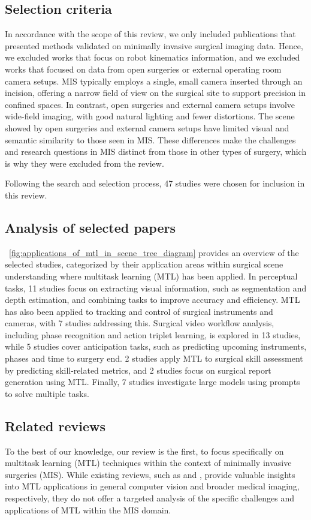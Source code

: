 \documentclass[times,twocolumn,final]{elsarticle}
\newcommand{\figref}[1]{\figurename~\ref{#1}}
\begin{document}
\subsection{Selection criteria}
In accordance with the scope of this review, we only included publications that presented methods validated on minimally invasive surgical imaging data. Hence, we excluded works that focus on robot kinematics information, and we excluded works that focused on data from open surgeries or external operating room camera setups. 
MIS typically employs a single, small camera inserted through an incision, offering a narrow field of view on the surgical site to support precision in confined spaces. In contrast, open surgeries and external camera setups involve wide-field imaging, with good natural lighting and fewer distortions. The scene showed by  open surgeries and external camera setups have limited visual and semantic similarity to those seen in MIS. These differences make the challenges and research questions in MIS distinct from those in other types of surgery, which is why they were excluded from the review.

Following the search and selection process, 47 studies were chosen for inclusion in this review.

\subsection{Analysis of selected papers}

\figref{fig:applications_of_mtl_in_scene_tree_diagram} provides an overview of the selected studies, categorized by their application areas within surgical scene understanding where multitask learning (MTL) has been applied. In perceptual tasks, 11 studies focus on extracting visual information, such as segmentation and depth estimation, and combining tasks to improve accuracy and efficiency. MTL has also been applied to tracking and control of surgical instruments and cameras, with 7 studies addressing this. Surgical video workflow analysis, including phase recognition and action triplet learning, is explored in 13 studies, while 5 studies cover anticipation tasks, such as predicting upcoming instruments, phases and time to surgery end. 2 studies apply MTL to surgical skill assessment by predicting skill-related metrics, and 2 studies focus on surgical report generation using MTL. Finally, 7 studies investigate large models using prompts to solve multiple tasks.

\subsection{Related reviews}
To the best of our knowledge, our review is the first,  to focus specifically on multitask learning (MTL) techniques within the context of minimally invasive surgeries (MIS).
While existing reviews, such as \citet{survey_simon} and \citet{zhao2023multi}, provide valuable insights into MTL applications in general computer vision and broader medical imaging, respectively, they do not offer a targeted analysis of the specific challenges and applications of MTL within the MIS domain. 
\end{document}

